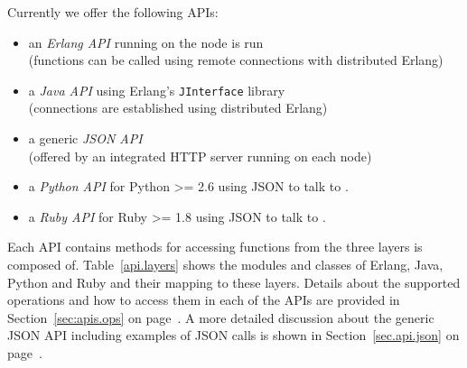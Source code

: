 \documentclass[a4paper]{scrreprt}
\newcommand{\sieheref}[1]{\ref{#1} on page~\pageref{#1}}
\newcommand{\code}[1]{\lstinline[basicstyle=\ttfamily]!#1!}
\begin{document}
Currently we offer the following APIs:
\begin{itemize}
  \item an \emph{Erlang API} running on the node \scalaris{} is run\\
        (functions can be called using remote connections with distributed
        Erlang)
  \item a \emph{Java API} using Erlang's \code{JInterface} library\\
        (connections are established using distributed Erlang)
  \item a generic \emph{JSON API}\\
        (offered by an integrated HTTP server running on each \scalaris{} node)
  \item a \emph{Python API} for Python >= 2.6 using JSON to talk to \scalaris{}. 
  \item a \emph{Ruby API} for Ruby >= 1.8 using JSON to talk to \scalaris{}. 
\end{itemize}

Each API contains methods for accessing functions from the three layers
\scalaris{} is composed of.
Table~\ref{api.layers} shows the modules and classes of Erlang, Java, Python and Ruby
and their mapping to these layers. Details about the supported operations and
how to access them in each of the APIs are provided in
Section~\sieheref{sec:apis.ops}. A more detailed discussion about the generic
JSON API including examples of JSON calls is shown in
Section~\sieheref{sec.api.json}.
\end{document}
